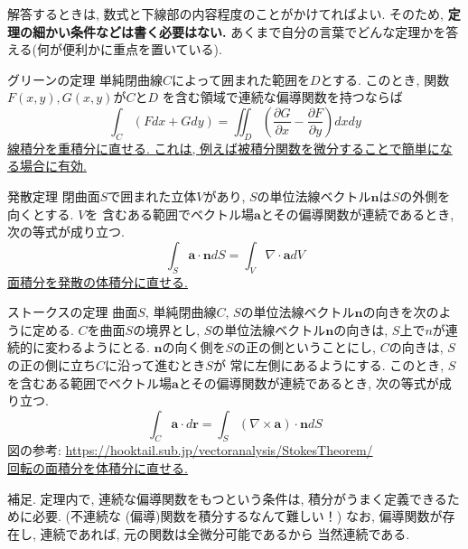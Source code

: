 \documentclass[a4j,dvipdfmx]{jsarticle}
\begin{document}
    解答するときは, 数式と下線部の内容程度のことがかけてればよい. そのため, \textbf{定理の細かい条件などは書く必要はない.}
    あくまで自分の言葉でどんな定理かを答える(何が便利かに重点を置いている).
    \begin{itembox}{グリーンの定理}
        \color{red}
        単純閉曲線$C$によって囲まれた範囲を$D$とする. このとき, 関数$F(x,y),G(x,y)$が$C$と$D$
        を含む領域で連続な偏導関数を持つならば
        \begin{equation}
            \int_C (Fdx+Gdy)=\iint_D \left(\frac{\partial G}{\partial x}-\frac{\partial F}{\partial y}\right)dxdy
        \end{equation}
        \underline{線積分を重積分に直せる. これは, 例えば被積分関数を微分することで簡単になる場合に有効.}
    \end{itembox}
    \begin{itembox}{発散定理}
        \color{red}
        閉曲面$S$で囲まれた立体$V$があり, $S$の単位法線ベクトル$\bm{n}$は$S$の外側を向くとする. $V$を
        含むある範囲でベクトル場$\bm{a}$とその偏導関数が連続であるとき, 次の等式が成り立つ.
        \begin{equation}
            \int_S \bm{a}\cdot\bm{n}dS=\int_V \nabla\cdot\bm{a}dV
        \end{equation}
        \underline{面積分を発散の体積分に直せる.}
    \end{itembox}
    \begin{itembox}{ストークスの定理}
        \color{red}
        曲面$S$, 単純閉曲線$C$,  $S$の単位法線ベクトル$\bm{n}$の向きを次のように定める. 
        $C$を曲面$S$の境界とし, $S$の単位法線ベクトル$\bm{n}$の向きは, $S$上で$n$が連続的に変わるようにとる.
        $\bm{n}$の向く側を$S$の正の側ということにし, $C$の向きは, $S$の正の側に立ち$C$に沿って進むとき$S$が
        常に左側にあるようにする.
        このとき, $S$を含むある範囲でベクトル場$\bm{a}$とその偏導関数が連続であるとき, 次の等式が成り立つ.
        \begin{equation}
            \int_C \bm{a}\cdot d\bm{r}=\int_S (\nabla\times\bm{a})\cdot \bm{n}dS
        \end{equation}
        {\footnotesize 図の参考: \url{https://hooktail.sub.jp/vectoranalysis/StokesTheorem/}}\\
        \underline{回転の面積分を体積分に直せる.}
    \end{itembox}
    補足. 定理内で, 連続な偏導関数をもつという条件は, 積分がうまく定義できるために必要. (不連続な
    (偏導)関数を積分するなんて難しい！) なお, 偏導関数が存在し, 連続であれば, 元の関数は全微分可能であるから
    当然連続である.
\end{document}

